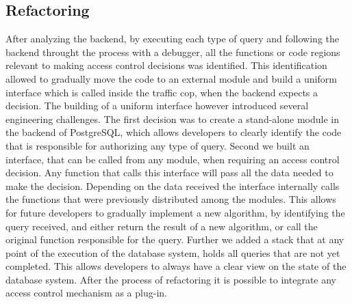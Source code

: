 \subsection{Refactoring}
%
After analyzing the backend, by executing each type of query and following the backend throught the process with a debugger, all the functions or code regions relevant to making access control decisions was identified.
%
This identification allowed to gradually move the code to an external module and build a uniform interface which is called inside the traffic cop, when the backend expects a decision. 
%
The building of a uniform interface however introduced several engineering challenges.
%
The first decision was to create a stand-alone module in the backend of PostgreSQL, which allows developers to clearly identify the code that is responsible for authorizing any type of query.
%
Second we built an interface, that can be called from any module, when requiring an access control decision.
%
Any function that calls this interface will pass all the data needed to make the decision.
%
Depending on the data received the interface internally calls the functions that were previously distributed among the modules.
%
This allows for future developers to gradually implement a new algorithm, by identifying the query received, and either return the result of a new algorithm, or call the original function responsible for the query.
%
Further we added a stack that at any point of the execution of the database system, holds all queries that are not yet completed.
%
This allows developers to always have a clear view on the state of the database system.
%
After the process of refactoring it is possible to integrate any access control mechanism as a plug-in.